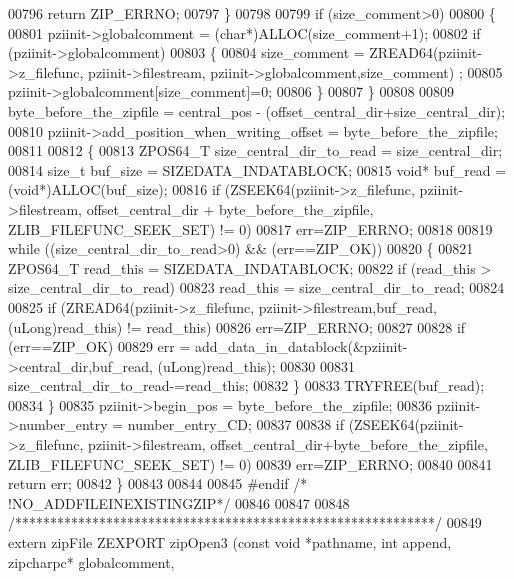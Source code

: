 \begin{DoxyCode}
00796     \textcolor{keywordflow}{return} ZIP\_ERRNO;
00797   \}
00798 
00799   \textcolor{keywordflow}{if} (size\_comment>0)
00800   \{
00801     pziinit->globalcomment = (\textcolor{keywordtype}{char}*)ALLOC(size\_comment+1);
00802     \textcolor{keywordflow}{if} (pziinit->globalcomment)
00803     \{
00804       size\_comment = ZREAD64(pziinit->z\_filefunc, pziinit->filestream, pziinit->globalcomment,size\_comment)
      ;
00805       pziinit->globalcomment[size\_comment]=0;
00806     \}
00807   \}
00808 
00809   byte\_before\_the\_zipfile = central\_pos - (offset\_central\_dir+size\_central\_dir);
00810   pziinit->add\_position\_when\_writing\_offset = byte\_before\_the\_zipfile;
00811 
00812   \{
00813     ZPOS64\_T size\_central\_dir\_to\_read = size\_central\_dir;
00814     \textcolor{keywordtype}{size\_t} buf\_size = SIZEDATA\_INDATABLOCK;
00815     \textcolor{keywordtype}{void}* buf\_read = (\textcolor{keywordtype}{void}*)ALLOC(buf\_size);
00816     \textcolor{keywordflow}{if} (ZSEEK64(pziinit->z\_filefunc, pziinit->filestream, offset\_central\_dir + byte\_before\_the\_zipfile, 
      ZLIB\_FILEFUNC\_SEEK\_SET) != 0)
00817       err=ZIP\_ERRNO;
00818 
00819     \textcolor{keywordflow}{while} ((size\_central\_dir\_to\_read>0) && (err==ZIP\_OK))
00820     \{
00821       ZPOS64\_T read\_this = SIZEDATA\_INDATABLOCK;
00822       \textcolor{keywordflow}{if} (read\_this > size\_central\_dir\_to\_read)
00823         read\_this = size\_central\_dir\_to\_read;
00824 
00825       \textcolor{keywordflow}{if} (ZREAD64(pziinit->z\_filefunc, pziinit->filestream,buf\_read,(uLong)read\_this) != read\_this)
00826         err=ZIP\_ERRNO;
00827 
00828       \textcolor{keywordflow}{if} (err==ZIP\_OK)
00829         err = add\_data\_in\_datablock(&pziinit->central\_dir,buf\_read, (uLong)read\_this);
00830 
00831       size\_central\_dir\_to\_read-=read\_this;
00832     \}
00833     TRYFREE(buf\_read);
00834   \}
00835   pziinit->begin\_pos = byte\_before\_the\_zipfile;
00836   pziinit->number\_entry = number\_entry\_CD;
00837 
00838   \textcolor{keywordflow}{if} (ZSEEK64(pziinit->z\_filefunc, pziinit->filestream, offset\_central\_dir+byte\_before\_the\_zipfile,
      ZLIB\_FILEFUNC\_SEEK\_SET) != 0)
00839     err=ZIP\_ERRNO;
00840 
00841   \textcolor{keywordflow}{return} err;
00842 \}
00843 
00844 
00845 \textcolor{preprocessor}{#endif }\textcolor{comment}{/* !NO\_ADDFILEINEXISTINGZIP*/}\textcolor{preprocessor}{}
00846 
00847 
00848 \textcolor{comment}{/************************************************************/}
00849 \textcolor{keyword}{extern} zipFile ZEXPORT zipOpen3 (\textcolor{keyword}{const} \textcolor{keywordtype}{void} *pathname, \textcolor{keywordtype}{int} append, zipcharpc* globalcomment, 

\end{DoxyCode}
